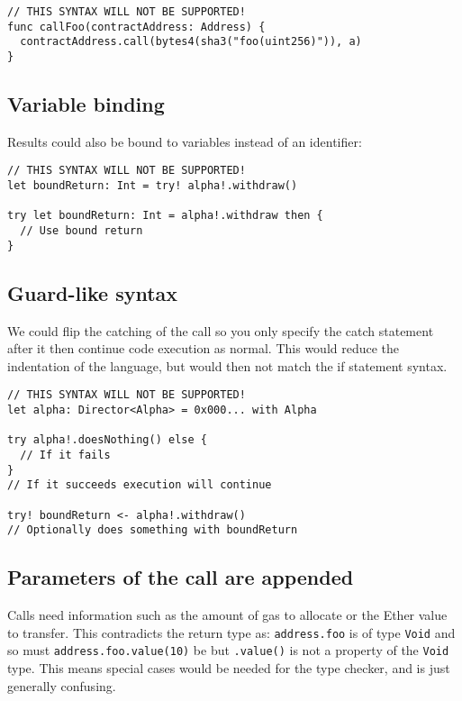 \begin{verbatim}
// THIS SYNTAX WILL NOT BE SUPPORTED!
func callFoo(contractAddress: Address) {
  contractAddress.call(bytes4(sha3("foo(uint256)")), a)
}
\end{verbatim}

\subsection{Variable binding}

Results could also be bound to variables instead of an identifier:

\begin{verbatim}
// THIS SYNTAX WILL NOT BE SUPPORTED!
let boundReturn: Int = try! alpha!.withdraw()

try let boundReturn: Int = alpha!.withdraw then {
  // Use bound return
}
\end{verbatim}

\subsection{Guard-like syntax}

We could flip the catching of the call so you only specify the catch statement after it then continue code execution as normal. This would reduce the indentation of the language, but would then not match the if statement syntax.

\begin{verbatim}
// THIS SYNTAX WILL NOT BE SUPPORTED!
let alpha: Director<Alpha> = 0x000... with Alpha

try alpha!.doesNothing() else {
  // If it fails
}
// If it succeeds execution will continue

try! boundReturn <- alpha!.withdraw()
// Optionally does something with boundReturn
\end{verbatim}

\subsection{Parameters of the call are appended}

Calls need information such as the amount of gas to allocate or the Ether value to transfer. This contradicts the return type as: \texttt{address.foo} is of type \texttt{Void} and so must \texttt{address.foo.value(10)} be but \texttt{.value()} is not a property of the \texttt{Void} type. This means special cases would be needed for the type checker, and is just generally confusing.

